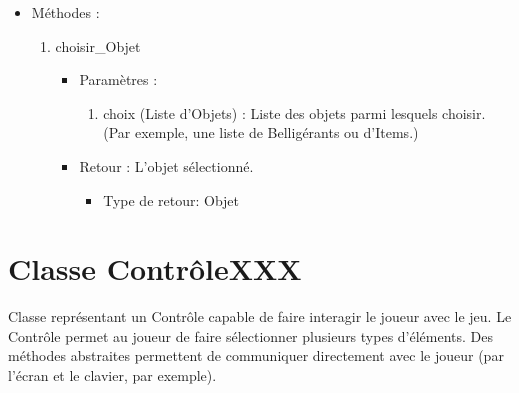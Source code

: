 \documentclass[12pt,pdftex,oneside]{article}
\begin{document}
  \begin{itemize}

  \item Méthodes : 

    \begin{enumerate}
    \item choisir\_Objet
      \begin{itemize}
      \item Paramètres : 
        \begin{enumerate}
        \item choix (Liste d'Objets) : Liste des objets parmi lesquels
          choisir. (Par exemple, une liste de Belligérants ou d'Items.)
        \end{enumerate}
      \item Retour : L'objet sélectionné.
          \begin{itemize}
          \item Type de retour: Objet
          \end{itemize}
      \end{itemize}
    \end{enumerate}
  \end{itemize}


  \section {Classe ContrôleXXX}

  Classe représentant un Contrôle capable de faire interagir le joueur
  avec le jeu. Le Contrôle permet au joueur de faire sélectionner 
  plusieurs types d'éléments. Des méthodes abstraites permettent de communiquer
  directement avec le joueur (par l'écran et le clavier, par exemple).
\end{document}
